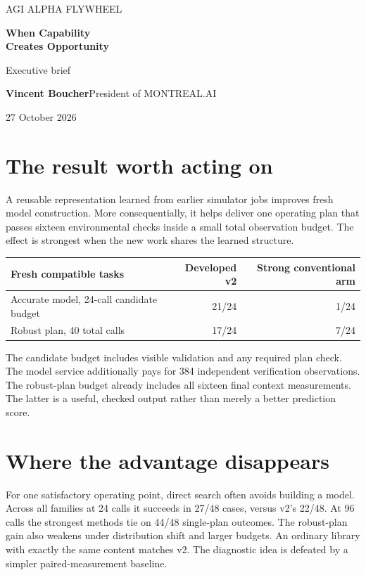 \documentclass[11pt,letterpaper]{article}
\begin{document}
{\sffamily\color{teal}\large AGI ALPHA FLYWHEEL}\par
{\Huge\bfseries When Capability\\Creates Opportunity}\par
\vspace{0.15in}
{\large Executive brief}\par
\textbf{Vincent Boucher}\quad President of MONTREAL.AI\par
27 October 2026\par
\section*{The result worth acting on}
A reusable representation learned from earlier simulator jobs improves fresh model construction. More consequentially, it helps deliver one operating plan that passes sixteen environmental checks inside a small total observation budget. The effect is strongest when the new work shares the learned structure.
\begin{center}\begin{tabular}{lrr}\toprule
Fresh compatible tasks & Developed v2 & Strong conventional arm\\\midrule
Accurate model, 24-call candidate budget & 21/24 & 1/24\\
Robust plan, 40 total calls & 17/24 & 7/24\\\bottomrule\end{tabular}\end{center}
The candidate budget includes visible validation and any required plan check. The model service additionally pays for 384 independent verification observations. The robust-plan budget already includes all sixteen final context measurements. The latter is a useful, checked output rather than merely a better prediction score.
\section*{Where the advantage disappears}
For one satisfactory operating point, direct search often avoids building a model. Across all families at 24 calls it succeeds in 27/48 cases, versus v2's 22/48. At 96 calls the strongest methods tie on 44/48 single-plan outcomes. The robust-plan gain also weakens under distribution shift and larger budgets. An ordinary library with exactly the same content matches v2. The diagnostic idea is defeated by a simpler paired-measurement baseline.
\end{document}
